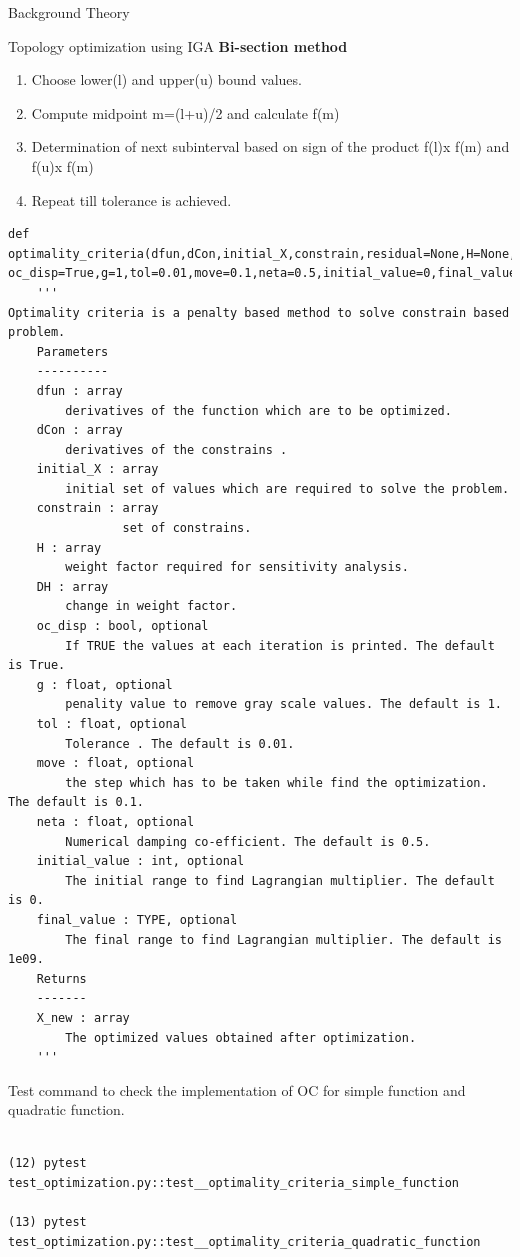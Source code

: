 \documentclass[a4paper,12pt,times]{article}
\begin{document}
\begin{section}{Background Theory}
\begin{subsection}{Topology optimization using IGA}
\textbf{Bi-section method}
\begin{enumerate}
\item Choose lower(l) and upper(u) bound values.
\item Compute midpoint m=(l+u)/2 and calculate f(m)
\item Determination of next subinterval based on sign of the product f(l)x f(m) and f(u)x f(m)
\item Repeat till tolerance is achieved.
\end{enumerate}
\begin{lstlisting}
def optimality_criteria(dfun,dCon,initial_X,constrain,residual=None,H=None,DH=None,
oc_disp=True,g=1,tol=0.01,move=0.1,neta=0.5,initial_value=0,final_value=1e09):
    '''
Optimality criteria is a penalty based method to solve constrain based problem.
    Parameters
    ----------
    dfun : array
        derivatives of the function which are to be optimized.
    dCon : array
        derivatives of the constrains .
    initial_X : array
        initial set of values which are required to solve the problem.
    constrain : array
                set of constrains.
    H : array
        weight factor required for sensitivity analysis.
    DH : array
        change in weight factor.
    oc_disp : bool, optional
        If TRUE the values at each iteration is printed. The default is True.
    g : float, optional
        penality value to remove gray scale values. The default is 1.
    tol : float, optional
        Tolerance . The default is 0.01.
    move : float, optional
        the step which has to be taken while find the optimization. The default is 0.1.
    neta : float, optional
        Numerical damping co-efficient. The default is 0.5.
    initial_value : int, optional
        The initial range to find Lagrangian multiplier. The default is 0.
    final_value : TYPE, optional
        The final range to find Lagrangian multiplier. The default is 1e09.
    Returns
    -------
    X_new : array 
        The optimized values obtained after optimization.
    '''
\end{lstlisting}
Test command to check the implementation of OC for simple function and quadratic function.
\begin{lstlisting}

(12) pytest test_optimization.py::test__optimality_criteria_simple_function

(13) pytest test_optimization.py::test__optimality_criteria_quadratic_function

\end{lstlisting}





\end{subsection}
\end{section}
\end{document}
